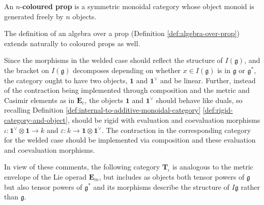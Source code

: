 \begin{definitions}
	An \(n\)-\textbf{coloured prop} is a symmetric monoidal category whose object monoid is generated freely by \(n\) objects.
\end{definitions}

The definition of an algebra over a prop (Definition \ref{def:algebra-over-prop}) extends naturally to coloured props as well.

Since the morphisms in the welded case should reflect the structure of \(I(\mathfrak{g})\), and the bracket on \(I(\mathfrak{g})\) decomposes depending on whether \(x \in I(\mathfrak{g})\) is in \(\mathfrak{g}\) or \(\mathfrak{g}^{\ast}\), the category ought to have two objects, \(\mathbf{1}\) and \(\mathbf{1}^{\vee}\) and be linear.
Further, instead of the contraction being implemented through composition and the metric and Casimir elements as in \(\mathbf{E}_{c}\), the objects \(\mathbf{1}\) and \(\mathbf{1}^{\vee}\) should behave like duals, so recalling Definition \ref{def:internal-to-additive-monoidal-category} \ref{def:rigid-category-and-object}, should be rigid with evaluation and coevaluation morphisms
\(\iota: \mathbf{1}^{\vee} \otimes \mathbf{1} \to k\) and \(\varepsilon : k \to \mathbf{1} \otimes \mathbf{1}^{\vee}\). The contraction in the corresponding category for the welded case should be implemented via composition and these evaluation and coevaluation morphisms.

In view of these comments, the following category \(\mathbf{T}_{\iota}\) is analogous to the metric envelope of the Lie operad \(\mathbf{E}_{m}\), but includes as objects both tensor powers of \(\mathfrak{g}\) but also tensor powers of \(\mathfrak{g}^{\ast}\) and its morphisms describe the structure of \(I\mathfrak{g}\) rather than \(\mathfrak{g}\).

